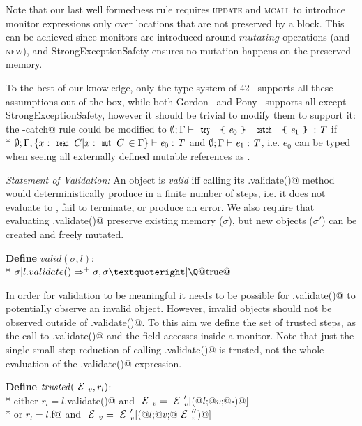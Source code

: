 
Note that our last well formedness rule requires 
\textsc{update} and \textsc{mcall} to introduce
monitor expressions only over locations
that are not preserved by a \Q@try@ block.
This can be achieved since monitors are introduced
around $\mathit{mutating}$ operations
(and \textsc{new}),
and StrongExceptionSafety ensures no mutation happens on the preserved memory.

To the best of our knowledge, only the type system of 42~\cite{ServettoEtAl13a,ServettoZucca15}
 supports all these assumptions out of the box,
while both Gordon~\cite{GordonEtAl12} and Pony~\cite{clebsch2015deny,clebsch2017orca} supports all except StrongExceptionSafety,
however it should be trivial to modify them to support it:
the \Q@try-catch@ rule could be modified to
$\emptyset;\Gamma\vdash\Kw{try}\ \oC\e_0\cC\ \Kw{catch}\ \oC\e_1\cC:\T$
if\\* $\emptyset;
\Gamma,\{x:\Kw{read}\,C | x:\Kw{mut}\,C\,\in\Gamma\}
\vdash\e_0:\T$ and $\emptyset;\Gamma\vdash\e_1:\T$,
i.e. $e_0$ can be typed when seeing all externally defined mutable references as \Q@read@.

\loseSpace
\noindent\textit{Statement of Validation:}
An object is \emph{valid} iff calling its \Q@.validate()@ method would
deterministically produce \Q@true@ in a finite number of steps, i.e. it does not evaluate to \Q@false@, fail to terminate, or produce an error.
We also require that evaluating \Q@.validate()@ preserve existing memory ($\sigma$), but new objects ($\sigma'$) can be created and freely mutated.

\noindent\textbf{Define} $valid(\sigma,l)$:\\*
\indent $\sigma | l.validate()\Rightarrow^+ \sigma,\sigma’ | \text{\Q@true@}$

\noindent In order for validation to be meaningful it needs to be possible for \Q@.validate()@ to potentially observe an invalid object. However, invalid objects should not be observed outside of \Q@.validate()@.
To this aim we define the set of trusted steps, 
as the call to \Q@.validate()@ and the field accesses inside a monitor.
Note that just the single small-step reduction
of calling \Q@.validate()@ is trusted, not the whole evaluation of the \Q@.validate()@ expression.


\noindent\textbf{Define} $\mathit{trusted}(\ctx_v,r_l)$:\\*
\indent either
$r_l=l$\Q@.validate()@ and
 $\ctx_v=\ctx_v'[$\Q@M(@$l$\Q@;@$v$\Q@;@$\square$\Q@)@$]$\\*
\indent or
$r_l=l$\Q@.f@ and
 $\ctx_v=\ctx_v'[$\Q@M(@$l$\Q@;@$v$\Q@;@$\ctx_v''$\Q@)@$]$

